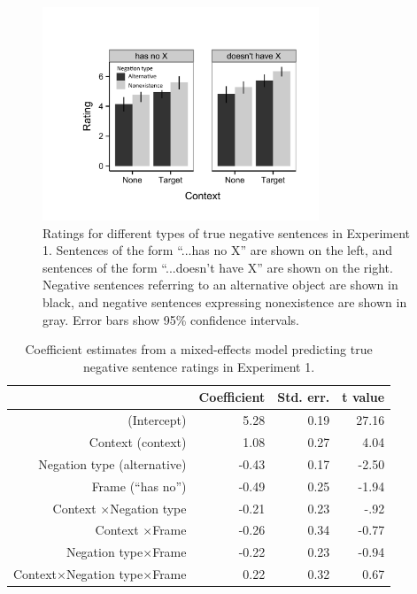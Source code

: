 \documentclass[10pt,letterpaper]{article}
\begin{document}
\begin{figure}
\begin{center} 
\includegraphics[width=3.25in]{figures/study1.pdf}
\caption{\label{fig:s1} Ratings for different types of true negative sentences in Experiment 1.  Sentences of the form ``...has no X'' are shown on the left, and sentences of the form ``...doesn't have X'' are shown on the right.  Negative sentences referring to an alternative object are shown in black, and negative sentences expressing nonexistence are shown in gray.  Error bars show 95\% confidence intervals.}
\vspace{-1.45cm}
\end{center} 
\end{figure}

\begin{table}[t]
\caption{\label{tab:s1} Coefficient estimates from a mixed-effects model predicting true negative sentence ratings in Experiment 1.}
\begin{center}
\small\addtolength{\tabcolsep}{-5pt}
\begin{tabular}{rrrr}
  \hline
 & Coefficient & Std. err. & t value \\ 
  \hline
(Intercept) & 5.28 & 0.19 & 27.16 \\ 
  Context (context) & 1.08 & 0.27 & 4.04  \\ 
  Negation type (alternative) & -0.43 & 0.17 & -2.50 \\
  Frame (``has no'') & -0.49 & 0.25 & -1.94 \\ 
  Context $\times$Negation type & -0.21 & 0.23 & -.92 \\
  Context $\times$Frame & -0.26 & 0.34 & -0.77 \\
  Negation type$\times$Frame & -0.22 & 0.23 & -0.94 \\
  Context$\times$Negation type$\times$Frame & 0.22 & 0.32 & 0.67 \\
   \hline
\end{tabular}
\end{center}
\end{table}
\end{document}
